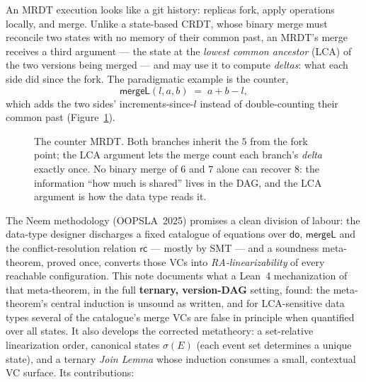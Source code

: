 \documentclass[11pt]{article}
\newcommand{\mergeL}{\mathsf{mergeL}}
\begin{document}
An MRDT execution looks like a git history: replicas fork, apply
operations locally, and merge. Unlike a state-based CRDT, whose binary
merge must reconcile two states with no memory of their common past, an
MRDT's merge receives a third argument --- the state at the \emph{lowest
common ancestor} (LCA) of the two versions being merged --- and may use it
to compute \emph{deltas}: what each side did since the fork. The
paradigmatic example is the counter,
\[
  \mergeL(l,a,b) \;=\; a + b - l,
\]
which adds the two sides' increments-since-$l$ instead of double-counting
their common past (Figure~\ref{fig:counter}).

\begin{figure}[t]
\centering
{}
\caption{The counter MRDT. Both branches inherit the $5$ from the fork
point; the LCA argument lets the merge count each branch's \emph{delta}
exactly once. No binary merge of $6$ and $7$ alone can recover $8$: the
information ``how much is shared'' lives in the DAG, and the LCA argument
is how the data type reads it.}
\label{fig:counter}
\end{figure}

The Neem methodology (OOPSLA~2025) promises a clean division of labour:
the data-type designer discharges a fixed catalogue of equations over
$\mathsf{do}$, $\mergeL$ and the conflict-resolution relation
$\mathsf{rc}$ --- mostly by SMT --- and a soundness meta-theorem, proved
once, converts those VCs into \emph{RA-linearizability} of every reachable
configuration. This note documents what a Lean~4 mechanization of that
meta-theorem, in the full \textbf{ternary, version-DAG} setting, found:
the meta-theorem's central induction is unsound as written, and for
LCA-sensitive data types several of the catalogue's merge VCs are false
in principle when quantified over all states. It also develops the
corrected metatheory: a set-relative linearization order, canonical
states $\sigma(E)$ (each event set determines a unique state), and a
ternary \emph{Join Lemma} whose induction
consumes a small, contextual VC surface. Its contributions:
\end{document}
